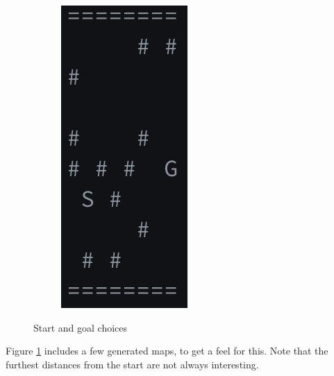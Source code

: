 \documentclass{article}
\begin{document}
\begin{figure}
\begin{subfigure}{0.2\textwidth}
\includegraphics[width=0.8\linewidth]{sg-4.png}
\end{subfigure}
\caption{Start and goal choices}
\label{fig:start-and-goal}
\end{figure}

Figure \ref{fig:start-and-goal} includes a few generated maps, to get a feel for this.
Note that the furthest distances from the start are not always interesting. 
\end{document}

